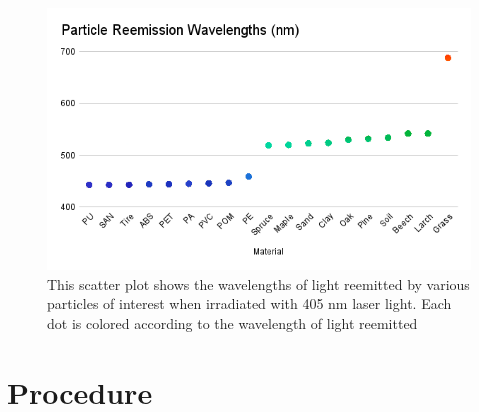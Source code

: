\documentclass[fleqn,10pt]{SelfArx} %
\begin{document}
	\begin{figure}[h]
		\centering
		\includegraphics[width=1\linewidth]{Figures/ReemissionWavelengths}
		\caption[Particle Reemission Wavelengths]{This scatter plot shows the wavelengths of light reemitted by various particles of interest when irradiated with 405 nm laser light. Each dot is colored according to the wavelength of light reemitted}
		\label{fig:Reemission}
	\end{figure}
	
	\section{Procedure}
	
\end{document}
